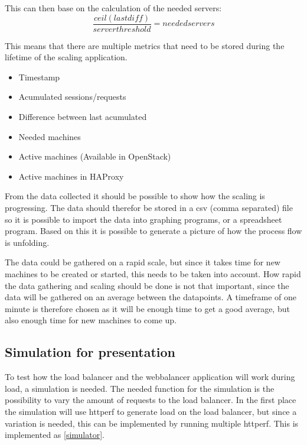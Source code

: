 This can then base on the calculation of the needed servers:
\begin{equation}
\frac{ceil(lastdiff)}{server threshold} = needed servers
\end{equation}

This means that there are multiple metrics that need to be stored during the
lifetime of the scaling application.
\begin{itemize}
\item Timestamp
\item Acumulated sessions/requests
\item Difference between last acumulated
\item Needed machines
\item Active machines (Available in OpenStack)
\item Active machines in HAProxy
\end{itemize}

From the data collected it should be possible to show how the scaling is
progressing. The data should therefor be stored in a csv (comma separated)
file so it is possible to import the data into graphing programs, or a
spreadsheet program. Based on this it is possible to generate a picture of how
the process flow is unfolding.

The data could be gathered on a rapid scale, but since it takes time for new
machines to be created or started, this needs to be taken into account. How
rapid the data gathering and scaling should be done is not that important,
since the data will be gathered on an average between the datapoints. A
timeframe of one minute is therefore chosen as it will be enough time to get a
good average, but also enough time for new machines to come up.

\subsection{Simulation for presentation}
To test how the load balancer and the webbalancer application will work during
load, a simulation is needed. The needed function for the simulation is the
possibility to vary the amount of requests to the load balancer. In the first
place the simulation will use httperf to generate load on the load balancer,
but since a variation is needed, this can be implemented by running multiple
httperf. This is implemented as \ref{simulator}.



